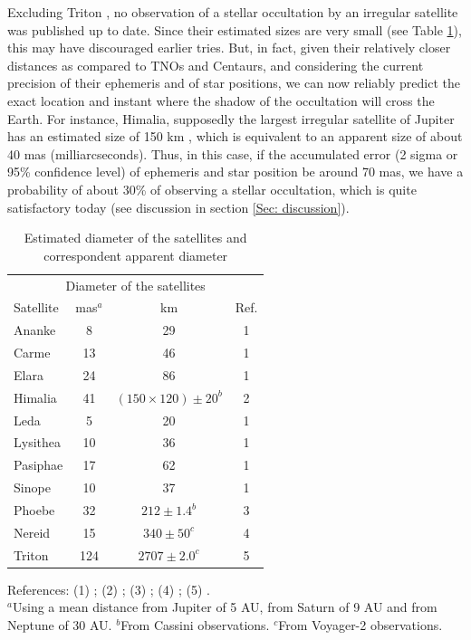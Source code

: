 \documentclass[useAMS,usenatbib]{mn2e}
\begin{document}
Excluding Triton \citep{Olkin1997, Elliot_2000}, no observation of a stellar occultation by an irregular satellite was published up to date. Since their estimated sizes are very small (see Table \ref{Tab: satellite-diameter}), this may have discouraged earlier tries. But, in fact, given their relatively closer distances as compared to TNOs and Centaurs, and considering the current precision of their ephemeris and of star positions, we can now reliably predict the exact location and instant where the shadow of the occultation will cross the Earth. For instance, Himalia, supposedly the largest irregular satellite of Jupiter has an estimated size of 150 km \citep{Porco2003}, which is equivalent to an apparent size of about 40 mas (milliarcseconds). Thus, in this case, if the accumulated error (2 sigma or 95\% confidence level) of ephemeris and star position be around 70 mas, we have a probability of about 30\% of observing a stellar occultation, which is quite satisfactory today (see discussion in section \ref{Sec: discussion}).

\begin{table}
\caption{\label{Tab: satellite-diameter} Estimated diameter of the satellites and correspondent apparent diameter}
\begin{center}
\begin{tabular}{lccc}
\hline  \hline
\multicolumn{4}{c}{Diameter of the satellites} \tabularnewline
Satellite  & mas$^ {a}$  & km & Ref. \tabularnewline
\hline
Ananke & 8 & 29 & 1 \tabularnewline
Carme & 13 & 46 & 1 \tabularnewline
Elara & 24 & 86 & 1 \tabularnewline
Himalia & 41 & $(150\times120) \pm 20^{b}$ & 2 \tabularnewline
Leda & 5 & 20 & 1 \tabularnewline
Lysithea & 10 & 36 & 1 \tabularnewline
Pasiphae & 17 & 62 & 1 \tabularnewline
Sinope & 10 & 37 & 1 \tabularnewline
\hdashline
Phoebe & 32 & $212 \pm 1.4^{b}$ & 3 \tabularnewline
\hdashline
Nereid & 15 & $340 \pm 50^{c}$ & 4 \tabularnewline
Triton & 124 & $2707 \pm 2.0^{c}$ & 5 \tabularnewline
\hline
\end{tabular}
\end{center}
References: (1) \cite{Rettig2001}; (2) \cite{Porco2003}; (3) \cite{Thomas2010}; (4) \cite{Thomas1991}; (5) \cite{Thomas2000}.\\
$^{a}${Using a mean distance from Jupiter of 5 AU, from Saturn of 9 AU and from Neptune of 30 AU.}
$^{b}${From Cassini observations.}
$^{c}${From Voyager-2 observations.}
\par
\end{table}
\end{document}
